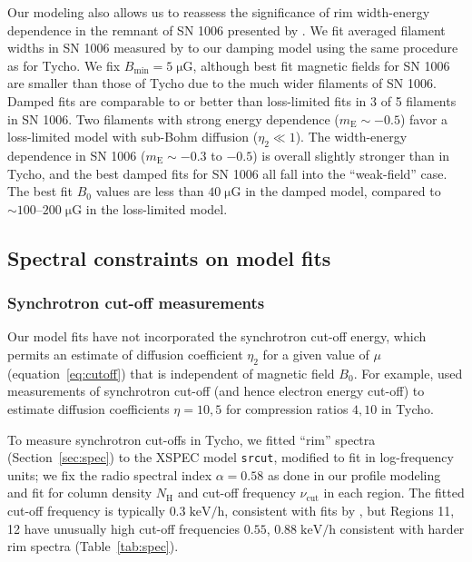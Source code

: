 \documentclass[manuscript]{aastex}  %
\newcommand*{\mt}{\mathrm}
\newcommand*{\unit}[1]{\;\mt{#1}}  %
\newcommand*{\abt}{\mathord{\sim}} %
\newcommand*{\mE}{m_\mt{E}}
\newcommand*{\Bmin}{B_{\mt{min}}}
\newcommand*{\muG}{\unit{\mu G}}
\begin{document}
Our modeling also allows us to reassess the significance of rim width-energy
dependence in the remnant of SN 1006 presented by .  We
fit averaged filament widths in SN 1006 measured by  to
our damping model using the same procedure as for Tycho.  We fix $\Bmin = 5
\muG$, although best fit magnetic fields for SN 1006 are smaller than those of
Tycho due to the much wider filaments of SN 1006.
Damped fits are comparable to or better than loss-limited fits in 3 of 5
filaments in SN 1006.  Two filaments with strong energy dependence ($\mE \sim
-0.5$) favor a loss-limited model with sub-Bohm diffusion ($\eta_2 \ll 1$).
The width-energy dependence in SN 1006 ($\mE \sim -0.3$ to $-0.5$) is overall
slightly stronger than in Tycho, and the best damped fits for SN 1006 all fall
into the ``weak-field'' case.  The best fit $B_0$ values are less than $40
\muG$ in the damped model, compared to $\abt 100$--$200 \muG$ in the
loss-limited model.

\subsection{Spectral constraints on model fits}

\subsubsection{Synchrotron cut-off measurements}

Our model fits have not incorporated the synchrotron cut-off energy, which
permits an estimate of diffusion coefficient $\eta_2$ for a given value of
$\mu$ (equation~\eqref{eq:cutoff}) that is independent of magnetic field
$B_0$.  For example, \citet{parizot2006} used measurements of synchrotron
cut-off (and hence electron energy cut-off) to estimate diffusion coefficients
$\eta = 10, 5$ for compression ratios $4, 10$ in Tycho.

To measure synchrotron cut-offs in Tycho, we fitted ``rim'' spectra
(Section~\ref{sec:spec}) to the XSPEC model \texttt{srcut}, modified to fit in
log-frequency units; we fix the radio spectral index $\alpha = 0.58$
\citep{sun2011} as done in our profile modeling and fit for column density
$N_{\mt{H}}$ and cut-off frequency $\nu_{\mt{cut}}$ in each region.  The
fitted cut-off frequency is typically $0.3 \unit{keV/h}$, consistent with fits
by \citet{hwang2002}, but Regions 11, 12 have unusually high cut-off
frequencies $0.55$, $0.88 \unit{keV/h}$ consistent with harder rim spectra
(Table~\ref{tab:spec}).
\end{document}

